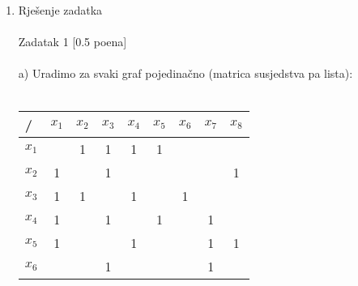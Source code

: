 \documentclass[12pt]{article}
\begin{document}
    
	\begin{enumerate}
		\item Rješenje zadatka \\
		\\
		Zadatak 1 [0.5 poena] \\
        \\
        a) Uradimo za svaki graf pojedinačno (matrica susjedstva pa lista): \\
        \\
\begin{tabular}{|l|c|c|c|c|c|c|c|c|}
\hline
/     & \multicolumn{1}{l|}{$x_1$} & \multicolumn{1}{l|}{$x_2$} & \multicolumn{1}{l|}{$x_3$} & \multicolumn{1}{l|}{$x_4$} & \multicolumn{1}{l|}{$x_5$} & \multicolumn{1}{l|}{$x_6$} & \multicolumn{1}{l|}{$x_7$} & \multicolumn{1}{l|}{$x_8$} \\ \hline
$x_1$ &                            & 1                          & 1                          & 1                          & 1                          &                            &                            &                            \\ \hline
$x_2$ & 1                          &                            & 1                          &                            &                            &                            &                            & 1                          \\ \hline
$x_3$ & 1                          & 1                          &                            & 1                          &                            & 1                          &                            &                            \\ \hline
$x_4$ & 1                          &                            & 1                          &                            & 1                          &                            & 1                          &                            \\ \hline
$x_5$ & 1                          &                            &                            & 1                          &                            &                            & 1                          & 1                          \\ \hline
$x_6$ &                            &                            & 1                          &                            &                            &                            & 1                          &                            \\ \hline

\end{tabular}
\end{enumerate}
\end{document}
